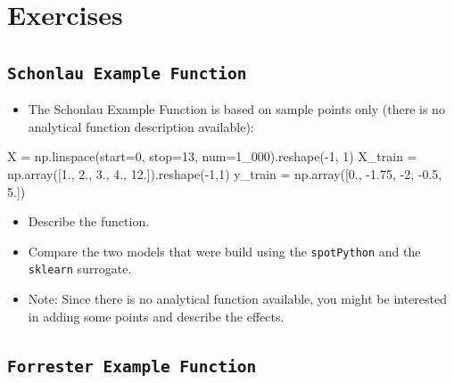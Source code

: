 \documentclass[
  letterpaper,
  DIV=11,
  numbers=noendperiod]{scrreprt}
\newenvironment{Shaded}{\begin{snugshade}}{\end{snugshade}}
\newcommand{\DecValTok}[1]{\textcolor[rgb]{0.68,0.00,0.00}{#1}}
\newcommand{\FloatTok}[1]{\textcolor[rgb]{0.68,0.00,0.00}{#1}}
\newcommand{\NormalTok}[1]{\textcolor[rgb]{0.00,0.23,0.31}{#1}}
\newcommand{\OperatorTok}[1]{\textcolor[rgb]{0.37,0.37,0.37}{#1}}
\providecommand{\tightlist}{%
  \setlength{\itemsep}{0pt}\setlength{\parskip}{0pt}}\usepackage{longtable,booktabs,array}
\begin{document}
\section{Exercises}\label{exercises-5}

\subsection{\texorpdfstring{\texttt{Schonlau\ Example\ Function}}{Schonlau Example Function}}\label{schonlau-example-function}

\begin{itemize}
\tightlist
\item
  The Schonlau Example Function is based on sample points only (there is
  no analytical function description available):
\end{itemize}

\begin{Shaded}
\begin{Highlighting}[]
\NormalTok{X }\OperatorTok{=}\NormalTok{ np.linspace(start}\OperatorTok{=}\DecValTok{0}\NormalTok{, stop}\OperatorTok{=}\DecValTok{13}\NormalTok{, num}\OperatorTok{=}\DecValTok{1\_000}\NormalTok{).reshape(}\OperatorTok{{-}}\DecValTok{1}\NormalTok{, }\DecValTok{1}\NormalTok{)}
\NormalTok{X\_train }\OperatorTok{=}\NormalTok{ np.array([}\FloatTok{1.}\NormalTok{, }\FloatTok{2.}\NormalTok{, }\FloatTok{3.}\NormalTok{, }\FloatTok{4.}\NormalTok{, }\FloatTok{12.}\NormalTok{]).reshape(}\OperatorTok{{-}}\DecValTok{1}\NormalTok{,}\DecValTok{1}\NormalTok{)}
\NormalTok{y\_train }\OperatorTok{=}\NormalTok{ np.array([}\FloatTok{0.}\NormalTok{, }\OperatorTok{{-}}\FloatTok{1.75}\NormalTok{, }\OperatorTok{{-}}\DecValTok{2}\NormalTok{, }\OperatorTok{{-}}\FloatTok{0.5}\NormalTok{, }\FloatTok{5.}\NormalTok{])}
\end{Highlighting}
\end{Shaded}

\begin{itemize}
\tightlist
\item
  Describe the function.
\item
  Compare the two models that were build using the \texttt{spotPython}
  and the \texttt{sklearn} surrogate.
\item
  Note: Since there is no analytical function available, you might be
  interested in adding some points and describe the effects.
\end{itemize}

\subsection{\texorpdfstring{\texttt{Forrester\ Example\ Function}}{Forrester Example Function}}\label{forrester-example-function}
\end{document}
